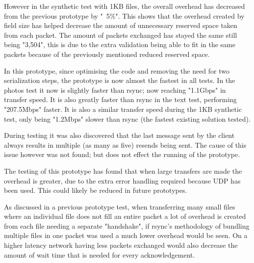 However in the synthetic test with 1KB files, the overall overhead has decreased from the previous prototype by "~5\%". This shows that the overhead created by field size has helped decrease the amount of unnecessary reserved space taken from each packet. The amount of packets exchanged has stayed the same still being "3,504", this is due to the extra validation being able to fit in the same packets because of the previously mentioned reduced reserved space.

In this prototype, since optimising the code and removing the need for two serialization steps, the prototype is now almost the fastest in all tests. In the photos test it now is slightly faster than rsync; now reaching "1.1Gbps" in transfer speed. It is also greatly faster than rsync in the text test, performing "207.5Mbps" faster. It is also a similar transfer speed during the 1KB synthetic test, only being "1.2Mbps" slower than rsync (the fastest existing solution tested).

During testing it was also discovered that the last message sent by the client always results in multiple (as many as five) resends being sent. The cause of this issue however was not found; but does not effect the running of the prototype.

The testing of this prototype has found that when large transfers are made the overhead is greater, due to the extra error handling required because UDP has been used. This could likely be reduced in future prototypes.

As discussed in a previous prototype test, when transferring many small files where an individual file does not fill an entire packet a lot of overhead is created from each file needing a separate "handshake", if rsync's methodology of bundling multiple files in one packet was used a much lower overhead would be seen. On a higher latency network having less packets exchanged would also decrease the amount of wait time that is needed for every acknowledgement.
